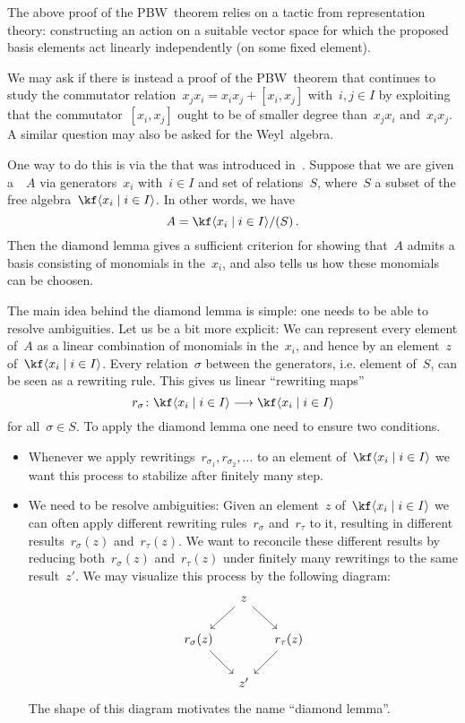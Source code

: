 \begin{remark}
	The above proof of the PBW~theorem relies on a tactic from representation theory:
	constructing an action on a suitable vector space for which the proposed basis elements act linearly independently (on some fixed element).

	We may ask if there is instead a proof of the PBW~theorem that continues to study the commutator relation~$x_j x_i = x_i x_j + [x_i, x_j]$ with~$i, j \in I$ by exploiting that the commutator~$[x_i, x_j]$ ought to be of smaller degree than~$x_j x_i$ and~$x_i x_j$.
	A similar question may also be asked for the Weyl~algebra.
	
	One way to do this is via the  that was introduced in~\cite{diamond_lemma}.
	Suppose that we are given a~\algebra{$\kf$}~$A$ via generators~$x_i$ with~$i \in I$ and set of relations~$S$, where~$S$ a subset of the free algebra~$\kf\gen{x_i \suchthat i \in I}$.
	In other words, we have
	\[
		A
		=
		\kf\gen{x_i \suchthat i \in I}
		/
		\ideal{ S } \,.
	\]
	Then the diamond lemma gives a sufficient criterion for showing that~$A$ admits a basis consisting of monomials in the~$x_i$, and also tells us how these monomials can be choosen.
	
	The main idea behind the diamond lemma is simple:
	one needs to be able to resolve ambiguities.
	Let us be a bit more explicit:
	We can represent every element of~$A$ as a linear combination of monomials in the~$x_i$, and hence by an element~$z$ of~$\kf\gen{x_i \suchthat i \in I}$.
	Every relation~$\sigma$ between the generators, i.e. element of~$S$, can be seen as a rewriting rule.
	This gives us linear \enquote{rewriting maps}
	\[
		r_\sigma
		\colon
		\kf\gen{x_i \suchthat i \in I}
		\to
		\kf\gen{x_i \suchthat i \in I}
	\]
	for all~$\sigma \in S$.
	To apply the diamond lemma one need to ensure two conditions.
	\begin{itemize}
		\item
			Whenever we apply rewritings~$r_{\sigma_1}, r_{\sigma_2}, \dotsc$ to an element of~$\kf\gen{x_i \suchthat i \in I}$ we want this process to stabilize after finitely many step.
		\item
			We need to be resolve ambiguities:
			Given an element~$z$ of~$\kf\gen{x_i \suchthat i \in I}$ we can often apply different rewriting rules~$r_\sigma$ and~$r_\tau$ to it, resulting in different results~$r_\sigma(z)$ and~$r_\tau(z)$.
			We want to reconcile these different results by reducing both~$r_\sigma(z)$ and~$r_\tau(z)$ under finitely many rewritings to the same result~$z'$.
			We may visualize this process by the following diagram:
			\[
				\begin{tikzcd}[column sep = small]
					{}
					&
					z
					\arrow{dl}
					\arrow{dr}
					&
					{}
					\\
					r_\sigma(z)
					\arrow{dr}
					&
					{}
					&
					r_\tau(z)
					\arrow{dl}
					\\
					{}
					&
					z'
					&
					{}
				\end{tikzcd}
			\]
			The shape of this diagram motivates the name \enquote{diamond lemma}.
	\end{itemize}
	

\end{remark}

